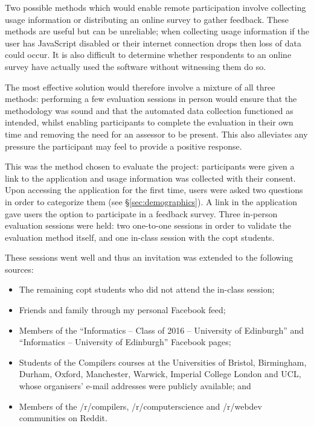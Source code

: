 \documentclass[bsc,twoside,singlespacing,parskip,logo,notimes,normalheadings]{infthesis}
\begin{document}
    Two possible methods which would enable remote participation
    involve collecting usage information or distributing an online
    survey to gather feedback. These methods are useful but can be
    unreliable; when collecting usage information if the user has
    JavaScript disabled or their internet connection drops then loss
    of data could occur. It is also difficult to determine whether
    respondents to an online survey have actually used the software
    without witnessing them do so.

    The most effective solution would therefore involve a mixture of
    all three methods: performing a few evaluation sessions in person
    would ensure that the methodology was sound and that the automated
    data collection functioned as intended, whilst enabling
    participants to complete the evaluation in their own time and
    removing the need for an assessor to be present. This also
    alleviates any pressure the participant may feel to provide a
    positive response.

    This was the method chosen to evaluate the project: participants
    were given a link to the application and usage information was
    collected with their consent. Upon accessing the application for
    the first time, users were asked two questions in order to
    categorize them (see \S\ref{sec:demographics}). A link in the
    application gave users the option to participate in a feedback
    survey. Three in-person evaluation sessions were held: two
    one-to-one sessions in order to validate the evaluation method
    itself, and one in-class session with the \gls{copt}
    students. 

    These sessions went well and thus an invitation was extended to
    the following sources:

    \begin{itemize}
    \item The remaining \gls{copt} students who did not attend the
      in-class session;
    \item Friends and family through my personal Facebook feed;
    \item Members of the ``Informatics -- Class of 2016 --
      University of Edinburgh'' and ``Informatics -- University of
      Edinburgh'' Facebook pages;
    \item Students of the Compilers courses at the Universities of
      Bristol, Birmingham, Durham, Oxford, Manchester, Warwick,
      Imperial College London and UCL, whose organisers' e-mail
      addresses were publicly available; and
    \item Members of the /r/compilers, /r/computerscience and
      /r/webdev communities on Reddit\cite{reddit}.
    \end{itemize}
\end{document}
